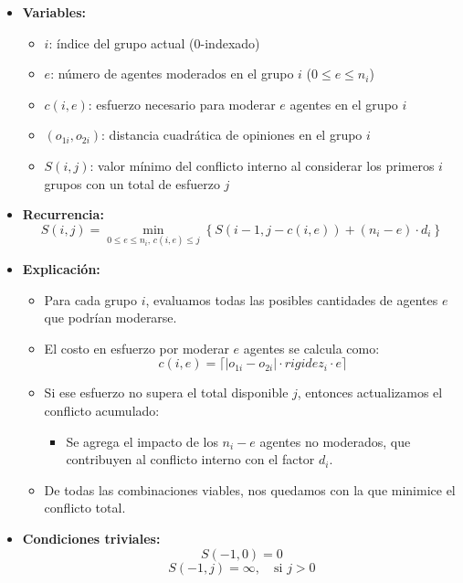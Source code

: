 \documentclass[11pt,letter]{article}
\begin{document}
    \begin{itemize}
        \item \textbf{Variables:}
        \begin{itemize}
            \item $i$: índice del grupo actual ($0$-indexado)
            \item $e$: número de agentes moderados en el grupo $i$ ($0 \leq e \leq n_i$)
            \item $c(i, e)$: esfuerzo necesario para moderar $e$ agentes en el grupo $i$
            \item $(o_{1i}, o_{2i})$: distancia cuadrática de opiniones en el grupo $i$
            \item $S(i, j)$: valor mínimo del conflicto interno al considerar los primeros $i$ grupos con un total de esfuerzo $j$
        \end{itemize}

        \item \textbf{Recurrencia:}
        \[
            S(i, j) = \min_{0 \leq e \leq n_i,\, c(i,e) \leq j} \left\{ S(i - 1, j - c(i, e)) + (n_i - e) \cdot d_i \right\}
        \]

        \item \textbf{Explicación:}
        \begin{itemize}
            \item Para cada grupo $i$, evaluamos todas las posibles cantidades de agentes $e$ que podrían moderarse.
            \item El costo en esfuerzo por moderar $e$ agentes se calcula como:
            \[
                c(i, e) = \lceil |o_{1i} - o_{2i}| \cdot rigidez_i \cdot e \rceil
            \]
            \item Si ese esfuerzo no supera el total disponible $j$, entonces actualizamos el conflicto acumulado:
            \begin{itemize}
                \item Se agrega el impacto de los $n_i - e$ agentes no moderados, que contribuyen al conflicto interno con el factor $d_i$.
            \end{itemize}
            \item De todas las combinaciones viables, nos quedamos con la que minimice el conflicto total.
        \end{itemize}

        \item \textbf{Condiciones triviales:}
        \[
            S(-1, 0) = 0
        \]
        \[
            S(-1, j) = \infty, \quad \text{si } j > 0
        \]


\end{itemize}
\end{document}
